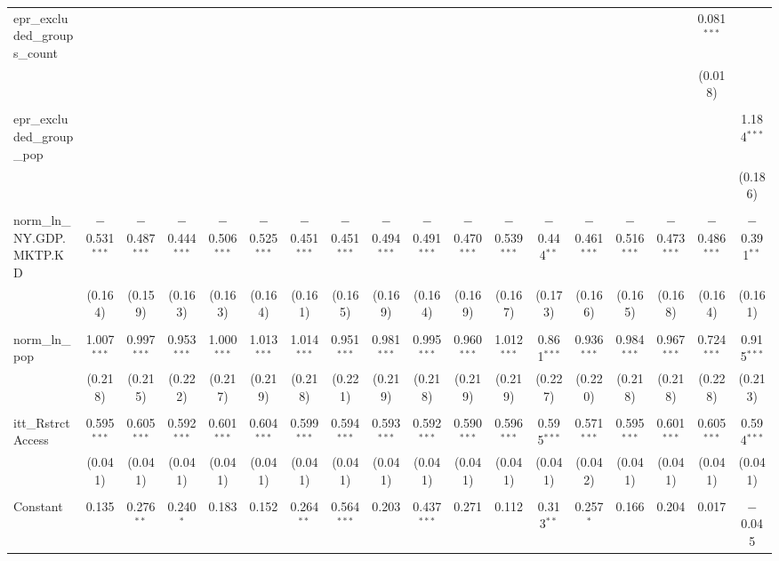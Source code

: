 \begin{table}[!htbp]
\begin{tabular}{@{\extracolsep{5pt}}lccccccccccccccccc}
 epr\_excluded\_groups\_count &  &  &  &  &  &  &  &  &  &  &  &  &  &  &  & 0.081$^{***}$ &  \\ 
  &  &  &  &  &  &  &  &  &  &  &  &  &  &  &  & (0.018) &  \\ 
  & & & & & & & & & & & & & & & & & \\ 
 epr\_excluded\_group\_pop &  &  &  &  &  &  &  &  &  &  &  &  &  &  &  &  & 1.184$^{***}$ \\ 
  &  &  &  &  &  &  &  &  &  &  &  &  &  &  &  &  & (0.186) \\ 
  & & & & & & & & & & & & & & & & & \\ 
 norm\_ln\_NY.GDP.MKTP.KD & $-$0.531$^{***}$ & $-$0.487$^{***}$ & $-$0.444$^{***}$ & $-$0.506$^{***}$ & $-$0.525$^{***}$ & $-$0.451$^{***}$ & $-$0.451$^{***}$ & $-$0.494$^{***}$ & $-$0.491$^{***}$ & $-$0.470$^{***}$ & $-$0.539$^{***}$ & $-$0.444$^{**}$ & $-$0.461$^{***}$ & $-$0.516$^{***}$ & $-$0.473$^{***}$ & $-$0.486$^{***}$ & $-$0.391$^{**}$ \\ 
  & (0.164) & (0.159) & (0.163) & (0.163) & (0.164) & (0.161) & (0.165) & (0.169) & (0.164) & (0.169) & (0.167) & (0.173) & (0.166) & (0.165) & (0.168) & (0.164) & (0.161) \\ 
  & & & & & & & & & & & & & & & & & \\ 
 norm\_ln\_pop & 1.007$^{***}$ & 0.997$^{***}$ & 0.953$^{***}$ & 1.000$^{***}$ & 1.013$^{***}$ & 1.014$^{***}$ & 0.951$^{***}$ & 0.981$^{***}$ & 0.995$^{***}$ & 0.960$^{***}$ & 1.012$^{***}$ & 0.861$^{***}$ & 0.936$^{***}$ & 0.984$^{***}$ & 0.967$^{***}$ & 0.724$^{***}$ & 0.915$^{***}$ \\ 
  & (0.218) & (0.215) & (0.222) & (0.217) & (0.219) & (0.218) & (0.221) & (0.219) & (0.218) & (0.219) & (0.219) & (0.227) & (0.220) & (0.218) & (0.218) & (0.228) & (0.213) \\ 
  & & & & & & & & & & & & & & & & & \\ 
 itt\_RstrctAccess & 0.595$^{***}$ & 0.605$^{***}$ & 0.592$^{***}$ & 0.601$^{***}$ & 0.604$^{***}$ & 0.599$^{***}$ & 0.594$^{***}$ & 0.593$^{***}$ & 0.592$^{***}$ & 0.590$^{***}$ & 0.596$^{***}$ & 0.595$^{***}$ & 0.571$^{***}$ & 0.595$^{***}$ & 0.601$^{***}$ & 0.605$^{***}$ & 0.594$^{***}$ \\ 
  & (0.041) & (0.041) & (0.041) & (0.041) & (0.041) & (0.041) & (0.041) & (0.041) & (0.041) & (0.041) & (0.041) & (0.041) & (0.042) & (0.041) & (0.041) & (0.041) & (0.041) \\ 
  & & & & & & & & & & & & & & & & & \\ 
 Constant & 0.135 & 0.276$^{**}$ & 0.240$^{*}$ & 0.183 & 0.152 & 0.264$^{**}$ & 0.564$^{***}$ & 0.203 & 0.437$^{***}$ & 0.271 & 0.112 & 0.313$^{**}$ & 0.257$^{*}$ & 0.166 & 0.204 & 0.017 & $-$0.045 \\ 

\end{tabular}
\end{table}
